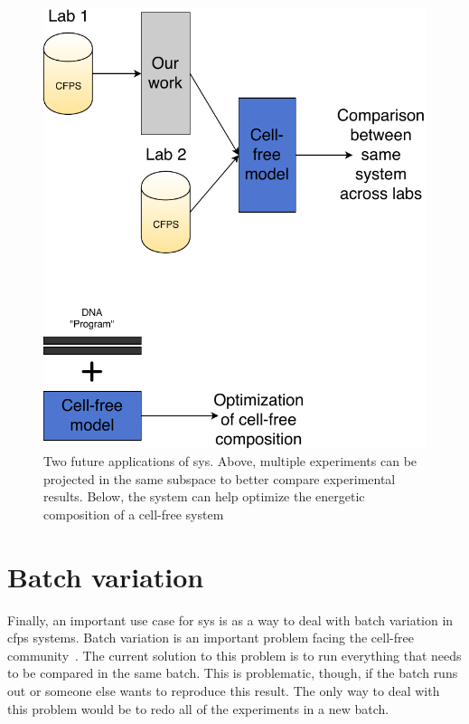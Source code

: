 \begin{figure}[t!]
\begin{center}
\includegraphics{figs/Applications.pdf}
\caption[Future applications of \gls{sys}]
{Two future applications of \gls{sys}.
Above, multiple experiments can be projected in the same subspace to better compare experimental results.
Below, the system can help optimize the energetic composition of a cell-free system}
\end{center}
\label{fig:apps}
\end{figure}

\section{Batch variation}
Finally, an important use case for \gls{sys} is as a way to deal with batch variation in \gls{cfps} systems.
Batch variation is an important problem facing the cell-free community~\cite{sun2013protocols, chizzolini2017cell}.
The current solution to this problem is to run everything that needs to be compared in the same batch.
This is problematic, though, if the batch runs out or someone else wants to reproduce this result.
The only way to deal with this problem would be to redo all of the experiments in a new batch.

